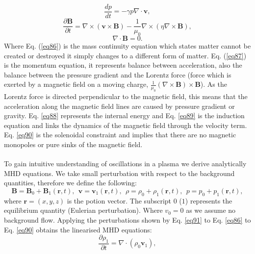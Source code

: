 \documentclass[12pt]{ociamthesis}
\begin{document}
\begin{equation}\label{eq88}
\frac{dp}{dt} = - \gamma p \nabla \cdot \boldsymbol{v},
\end{equation}
\begin{equation}\label{eq89}
\frac{\partial \boldsymbol{B}}{\partial t} = \nabla \times (\boldsymbol{v} \times \boldsymbol{B}) - \frac{1}{\mu_0} \nabla \times (\eta \nabla \times \boldsymbol{B}),
\end{equation}
\begin{equation}\label{eq90}
\nabla \cdot \boldsymbol{B} = 0.
\end{equation}
Where Eq. (\ref{eq86}) is the mass continuity equation which states matter cannot be created or destroyed it simply changes to a different form of matter. Eq. (\ref{eq87}) is the momentum equation, it represents balance between acceleration, also the balance between the pressure gradient and the Lorentz force (force which is exerted by a magnetic field on a moving charge, $\frac{1}{\mu_0} (\nabla \times \boldsymbol{B}) \times \boldsymbol{B}$). As the Lorentz force is directed perpendicular to the magnetic field, this means that the acceleration along the magnetic field lines are caused by pressure gradient or gravity. Eq. \eqref{eq88} represents the internal energy and Eq. \eqref{eq89} is the induction equation and links the dynamics of the magnetic field through the velocity term. Eq. \eqref{eq90} is the solenoidal constraint and implies that there are no magnetic monopoles or pure sinks of the magnetic field.\\ \\ To gain intuitive understanding of oscillations in a plasma we derive analytically MHD equations. We take small perturbation with respect to the background quantities, therefore we define the following:
\begin{equation} \label{eq91}
\boldsymbol{B} = \boldsymbol{B}_0 + \boldsymbol{B}_1 (\boldsymbol{r},t) , \ \ \boldsymbol{v} = \boldsymbol{v}_1 (\boldsymbol{r}, t) , \ \ \rho = \rho_0 + \rho_1 ( \boldsymbol{r},t) , \ \ p = p_0 + p_1 ( \boldsymbol{r}, t) ,
\end{equation}
where $\boldsymbol{r} = (x,y,z)$ is the potion vector. The subscript $0$ ($1$) represents the equilibrium quantity (Eulerian perturbation). Where $v_0=0$ as we assume no background flow. Applying the perturbations shown by Eq. \eqref{eq91} to Eq. \eqref{eq86} to Eq. \eqref{eq90} obtains the linearised MHD equations: 
\begin{equation}
\frac{\partial \rho_1}{\partial t} = \nabla \cdot (\rho_0 \boldsymbol{v}_1) ,
\end{equation}
\end{document}
